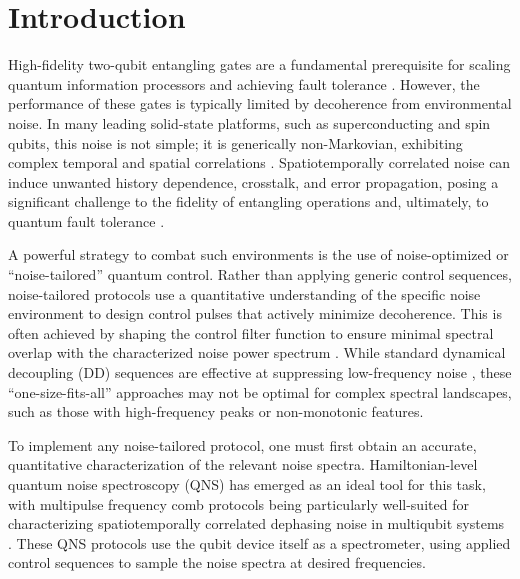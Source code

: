 \documentclass[%
 reprint,
superscriptaddress,
 amsmath,amssymb,
 aps,
pra,
floatfix,
]{revtex4-2}
\begin{document}
\section{Introduction}

High-fidelity two-qubit entangling gates are a fundamental prerequisite for scaling quantum information processors and achieving fault tolerance \cite{NgPreskill, Acharya2025}. However, the performance of these gates is typically limited by decoherence from environmental noise. In many leading solid-state platforms, such as superconducting and spin qubits, this noise is not simple; it is generically non-Markovian, exhibiting complex temporal and spatial correlations \cite{Bylander2011Jul, PhysRevA.95.022121, Uwe2020}. Spatiotemporally correlated noise can induce unwanted history dependence, crosstalk, and error propagation, posing a significant challenge to the fidelity of entangling operations and, ultimately, to quantum fault tolerance \cite{Sarovar2020detectingcrosstalk, PhysRevA.104.L050404, PhysRevA.102.022221}.

A powerful strategy to combat such environments is the use of noise-optimized or ``noise-tailored'' quantum control. Rather than applying generic control sequences, noise-tailored protocols use a quantitative understanding of the specific noise environment to design control pulses that actively minimize decoherence. This is often achieved by shaping the control filter function to ensure minimal spectral overlap with the characterized noise power spectrum \cite{Faoro}. While standard dynamical decoupling (DD) sequences are effective at suppressing low-frequency noise \cite{Khodjasteh2013-ut, PazSilva2016}, these ``one-size-fits-all'' approaches may not be optimal for complex spectral landscapes, such as those with high-frequency peaks or non-monotonic features.

To implement any noise-tailored protocol, one must first obtain an accurate, quantitative characterization of the relevant noise spectra. Hamiltonian-level quantum noise spectroscopy (QNS) has emerged as an ideal tool for this task, with multipulse frequency comb protocols being particularly well-suited for characterizing spatiotemporally correlated dephasing noise in multiqubit systems \cite{CombMultiaxis, PhysRevA.94.012109, PhysRevA.95.022121, PhysRevLett.116.150503}. These QNS protocols use the qubit device itself as a spectrometer, using applied control sequences to sample the noise spectra at desired frequencies.
\end{document}
